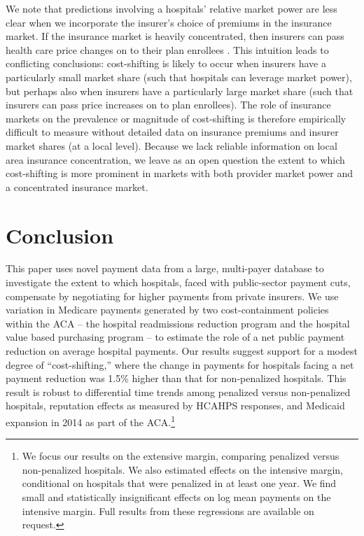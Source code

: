 \documentclass[12pt]{article}
\begin{document}
We note that predictions involving a hospitals' relative market power are less clear when we incorporate the insurer's choice of premiums in the insurance market. If the insurance market is heavily concentrated, then insurers can pass health care price changes on to their plan enrollees \citep{trish2015,ho2017}. This intuition leads to conflicting conclusions: cost-shifting is likely to occur when insurers have a particularly small market share (such that hospitals can leverage market power), but perhaps also when insurers have a particularly large market share (such that insurers can pass price increases on to plan enrollees). The role of insurance markets on the prevalence or magnitude of cost-shifting is therefore empirically difficult to measure without detailed data on insurance premiums and insurer market shares (at a local level). Because we lack reliable information on local area insurance concentration, we leave as an open question the extent to which cost-shifting is more prominent in markets with both provider market power and a concentrated insurance market.

\section{Conclusion}
\label{sec:Conclusion}
This paper uses novel payment data from a large, multi-payer database to investigate the extent to which hospitals, faced with public-sector payment cuts, compensate by negotiating for higher payments from private insurers.  We use variation in Medicare payments generated by two cost-containment policies within the ACA -- the hospital readmissions reduction program and the hospital value based purchasing program -- to estimate the role of a net public payment reduction on average hospital payments.  Our results suggest support for a modest degree of ``cost-shifting,''  where the change in payments for hospitals facing a net payment reduction was 1.5\% higher than that for non-penalized hospitals. This result is robust to differential time trends among penalized versus non-penalized hospitals, reputation effects as measured by HCAHPS responses, and Medicaid expansion in 2014 as part of the ACA.\footnote{We focus our results on the extensive margin, comparing penalized versus non-penalized hospitals. We also estimated effects on the intensive margin, conditional on hospitals that were penalized in at least one year. We find small and statistically insignificant effects on log mean payments on the intensive margin. Full results from these regressions are available on request.}
\end{document}
